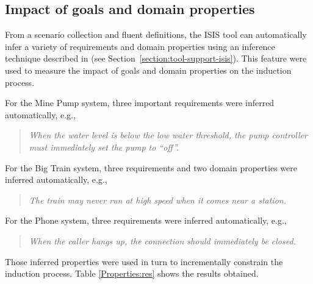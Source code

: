 
\subsection{Impact of goals and domain properties}

From a scenario collection and fluent definitions, the ISIS tool can automatically infer a variety of requirements and domain properties using an inference technique described in \cite{Damas:2006, Damas:2011} (see Section~\ref{section:tool-support-isis}). This feature were used to measure the impact of goals and domain properties on the induction process.

For the Mine Pump system, three important requirements were inferred automatically, e.g.,
\begin{quote}
\emph{When the water level is below the low water threshold, the pump controller must immediately set the pump to ``off''.}
\end{quote}

For the Big Train system, three requirements and two domain properties were inferred automatically, e.g.,
\begin{quote}
\emph{The train may never run at high speed when it comes near a station.}
\end{quote}

For the Phone system, three requirements were inferred automatically, e.g.,

\begin{quote}
\emph{When the caller hangs up, the connection should immediately be closed.}
\end{quote}

Those inferred properties were used in turn to incrementally constrain the induction process. Table \ref{Properties:res} shows the results obtained.

